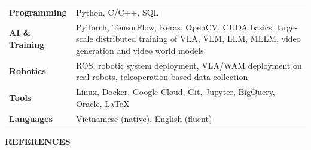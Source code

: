 \documentclass[10pt,a4paper]{article}
\newcommand{\cvsection}[1]{%
  \vspace{10pt}\par\Needspace{6\baselineskip}\noindent
  {\small\bfseries\MakeUppercase{#1}}%
  \hspace{6pt}{\color{rulegray}\leaders\hrule height 0.6pt\hfill\kern0pt}%
  \par\vspace{6pt}%
}
\newlength{\datecol}\setlength{\datecol}{1.12in}
\newlength{\colgap}\setlength{\colgap}{8pt}
\begin{document}
\small
\begin{tabularx}{\linewidth}{@{}p{\datecol}@{\hspace{\colgap}}X@{}}
  \textbf{Programming} & Python, C/C++, SQL \\[2pt]
  \textbf{AI \& Training} & PyTorch, TensorFlow, Keras, OpenCV, CUDA basics; large-scale distributed training of VLA, VLM, LLM, MLLM, video generation and video world models \\[2pt]
  \textbf{Robotics} & ROS, robotic system deployment, VLA/WAM deployment on real robots, teleoperation-based data collection \\[2pt]
  \textbf{Tools} & Linux, Docker, Google Cloud, Git, Jupyter, BigQuery, Oracle, LaTeX \\[2pt]
  \textbf{Languages} & Vietnamese (native), English (fluent) \\
\end{tabularx}
\normalsize

\cvsection{References}
\end{document}
